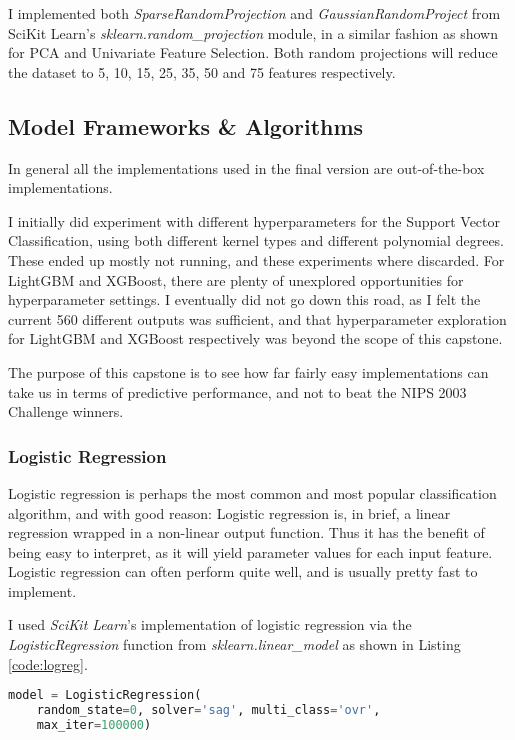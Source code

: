 \documentclass[12pt]{article}
\begin{document}
I implemented both \emph{SparseRandomProjection} and \emph{GaussianRandomProject} from SciKit Learn's \emph{sklearn.random\_projection} module, in a similar fashion as shown for PCA and Univariate Feature Selection. Both random projections will reduce the dataset to 5, 10, 15, 25, 35, 50 and 75 features respectively.

\subsection{Model Frameworks \& Algorithms}\label{impl:modfit}

In general all the implementations used in the final version are out-of-the-box implementations. 

I initially did experiment with different hyperparameters for the Support Vector Classification, using both different kernel types and different polynomial degrees. These ended up mostly not running, and these experiments where discarded. For LightGBM and XGBoost, there are plenty of unexplored opportunities for hyperparameter settings. I eventually did not go down this road, as I felt the current 560 different outputs was sufficient, and that hyperparameter exploration for LightGBM and XGBoost respectively was beyond the scope of this capstone.

The purpose of this capstone is to see how far fairly easy implementations can take us in terms of predictive performance, and not to beat the NIPS 2003 Challenge winners.

\subsubsection{Logistic Regression}

Logistic regression is perhaps the most common and most popular classification algorithm, and with good reason: Logistic regression is, in brief, a linear regression wrapped in a non-linear output function. Thus it has the benefit of being easy to interpret, as it will yield parameter values for each input feature. Logistic regression can often perform quite well, and is usually pretty fast to implement. 

I used \emph{SciKit Learn}'s implementation of logistic regression via the \emph{LogisticRegression} function from \emph{sklearn.linear\_model} as shown in Listing \ref{code:logreg}.

\begin{lstlisting}[language=python,frame=single,caption=Logistic Regression Implementation, label=code:logreg]
model = LogisticRegression(
    random_state=0, solver='sag', multi_class='ovr',
    max_iter=100000)
\end{lstlisting}
\end{document}
